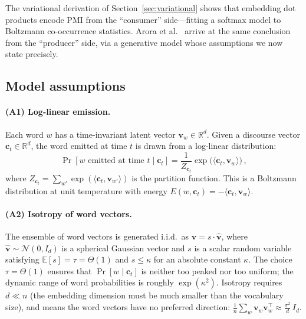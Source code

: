 \documentclass[11pt]{article}
\newcommand{\vw}{\bm{v}}
\begin{document}
The variational derivation of Section~\ref{sec:variational} shows that embedding dot products encode PMI from the ``consumer'' side---fitting a softmax model to Boltzmann co-occurrence statistics. Arora et al.~\cite{arora2016} arrive at the same conclusion from the ``producer'' side, via a generative model whose assumptions we now state precisely.

\subsection{Model assumptions}

\paragraph{(A1) Log-linear emission.} Each word $w$ has a time-invariant latent vector $\vw_w \in \mathbb{R}^d$. Given a discourse vector $\bm{c}_t \in \mathbb{R}^d$, the word emitted at time $t$ is drawn from a log-linear distribution:
\begin{equation}\label{eq:rw-emission}
    \Pr[w \text{ emitted at time } t \mid \bm{c}_t] = \frac{1}{Z_{\bm{c}_t}} \exp\!\big(\langle \bm{c}_t, \vw_w \rangle\big)\,,
\end{equation}
where $Z_{\bm{c}_t} = \sum_{w'} \exp(\langle \bm{c}_t, \vw_{w'} \rangle)$ is the partition function. This is a Boltzmann distribution at unit temperature with energy $E(w, \bm{c}_t) = -\langle \bm{c}_t, \vw_w \rangle$.

\paragraph{(A2) Isotropy of word vectors.} The ensemble of word vectors is generated i.i.d.\ as $\vw = s \cdot \hat{\vw}$, where $\hat{\vw} \sim \mathcal{N}(0, I_d)$ is a spherical Gaussian vector and $s$ is a scalar random variable satisfying $\mathbb{E}[s] = \tau = \Theta(1)$ and $s \leq \kappa$ for an absolute constant $\kappa$. The choice $\tau = \Theta(1)$ ensures that $\Pr[w \mid \bm{c}_t]$ is neither too peaked nor too uniform; the dynamic range of word probabilities is roughly $\exp(\kappa^2)$. Isotropy requires $d \ll n$ (the embedding dimension must be much smaller than the vocabulary size), and means the word vectors have no preferred direction: $\frac{1}{n} \sum_w \vw_w \vw_w^\top \approx \frac{\sigma^2}{d}\, I_d$.
\end{document}
